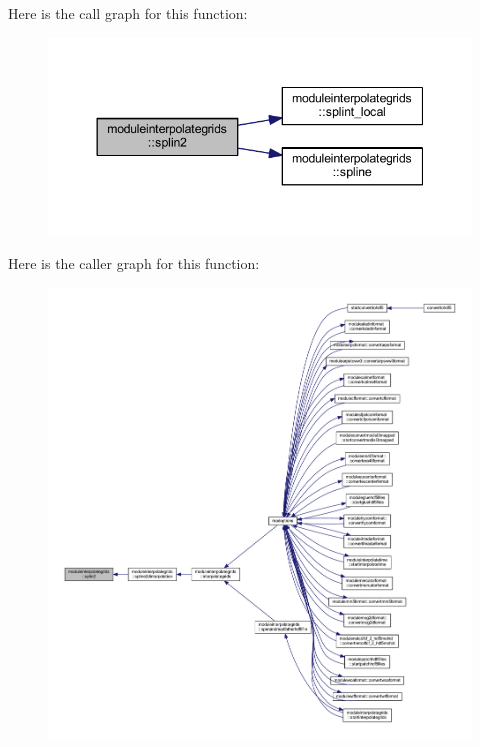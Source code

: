 Here is the call graph for this function\+:\nopagebreak
\begin{figure}[H]
\begin{center}
\leavevmode
\includegraphics[width=344pt]{namespacemoduleinterpolategrids_a3af6dc367d6a4dfa5e4250dcb85ab37f_cgraph}
\end{center}
\end{figure}
Here is the caller graph for this function\+:\nopagebreak
\begin{figure}[H]
\begin{center}
\leavevmode
\includegraphics[width=350pt]{namespacemoduleinterpolategrids_a3af6dc367d6a4dfa5e4250dcb85ab37f_icgraph}
\end{center}
\end{figure}
\mbox{\label{namespacemoduleinterpolategrids_ab307084ecee857465992d138cb9d22d3}} 
